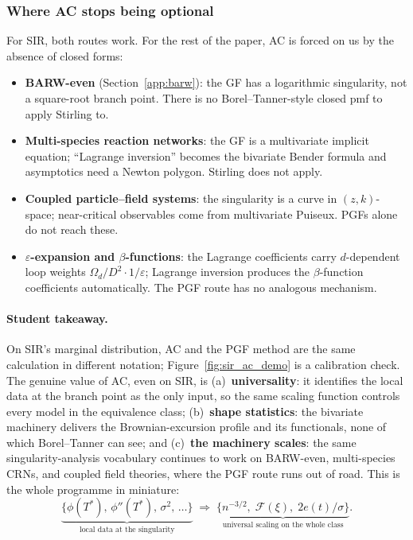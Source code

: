 \documentclass[11pt,a4paper]{article}
\theoremstyle{definition}
\begin{document}
\subsubsection*{Where AC stops being optional}

For SIR, both routes work. For the rest of the paper, AC is forced on
us by the absence of closed forms:

\begin{itemize}[leftmargin=1.4em,itemsep=2pt]
\item \textbf{BARW-even} (Section~\ref{app:barw}): the GF has a
      logarithmic singularity, not a square-root branch point. There
      is no Borel--Tanner-style closed pmf to apply Stirling to.
\item \textbf{Multi-species reaction networks}: the GF is a
      multivariate implicit equation; ``Lagrange inversion''
      becomes the bivariate Bender formula and asymptotics need a
      Newton polygon. Stirling does not apply.
\item \textbf{Coupled particle--field systems}: the singularity is a
      curve in $(z, k)$-space; near-critical observables come from
      multivariate Puiseux. PGFs alone do not reach these.
\item \textbf{$\varepsilon$-expansion and $\beta$-functions}: the
      Lagrange coefficients carry $d$-dependent loop weights
      $\Omega_d/D^2 \cdot 1/\varepsilon$; Lagrange inversion produces
      the $\beta$-function coefficients automatically. The PGF route
      has no analogous mechanism.
\end{itemize}

\paragraph{Student takeaway.}
On SIR's marginal distribution, AC and the PGF method are the same
calculation in different notation; Figure~\ref{fig:sir_ac_demo} is a
calibration check. The genuine value of AC, even on SIR, is
(a)~\textbf{universality}: it identifies the local data at the branch
point as the only input, so the same scaling function controls every
model in the equivalence class; (b)~\textbf{shape statistics}: the
bivariate machinery delivers the Brownian-excursion profile and its
functionals, none of which Borel--Tanner can see; and (c)~\textbf{the
machinery scales}: the same singularity-analysis vocabulary continues
to work on BARW-even, multi-species CRNs, and coupled field theories,
where the PGF route runs out of road. This is the whole programme in
miniature:
\[
\underbrace{\{\phi(T^*),\,\phi''(T^*),\,\sigma^2,\,\ldots\}}_{\text{local data at the singularity}}
\;\Longrightarrow\;
\underbrace{\{n^{-3/2},\;\mathcal{F}(\xi),\;2e(t)/\sigma\}}_{\text{universal scaling on the whole class}}.
\]
\end{document}
